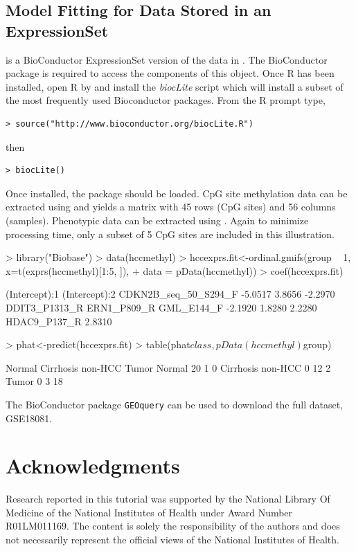 \documentclass[article, shortclass, nojss]{jss}
\begin{document}
\subsection{Model Fitting for Data Stored in an ExpressionSet}
 is a BioConductor ExpressionSet version of the data in . The  BioConductor package is required to access the components of this object. Once R has been installed, open R by and install the \textit{biocLite} script which will install a subset of the most frequently used Bioconductor packages. From the R prompt type,
\begin{verbatim}
> source("http://www.bioconductor.org/biocLite.R")
\end{verbatim}
then
\begin{verbatim}
> biocLite() 
\end{verbatim}
Once installed, the  package should be loaded. CpG site methylation data can be extracted using  and yields a matrix with 45 rows (CpG sites) and  56 columns (samples). Phenotypic data can be extracted using . Again to minimize processing time, only a subset of 5 CpG sites are included in this illustration.
\begin{Schunk}
\begin{Sinput}
> library("Biobase")
> data(hccmethyl)
> hccexprs.fit<-ordinal.gmifs(group ~ 1, x=t(exprs(hccmethyl)[1:5, ]), 
+ 	data = pData(hccmethyl))
> coef(hccexprs.fit)
\end{Sinput}
\begin{Soutput}
       (Intercept):1        (Intercept):2 CDKN2B_seq_50_S294_F 
             -5.0517               3.8656              -2.2970 
       DDIT3_P1313_R          ERN1_P809_R           GML_E144_F 
             -2.1920               1.8280               2.2280 
        HDAC9_P137_R 
              2.8310 
\end{Soutput}
\begin{Sinput}
> phat<-predict(hccexprs.fit)
> table(phat$class, pData(hccmethyl)$group)
\end{Sinput}
\begin{Soutput}
                    Normal Cirrhosis non-HCC Tumor
  Normal                20                 1     0
  Cirrhosis non-HCC      0                12     2
  Tumor                  0                 3    18
\end{Soutput}
\end{Schunk}
The BioConductor package \texttt{GEOquery} can be used to download the full dataset, GSE18081. 

\section*{Acknowledgments}
Research reported in this tutorial was supported by the National Library Of Medicine of the National Institutes of Health under Award Number R01LM011169. The content is solely the responsibility of the authors and does not necessarily represent the official views of the National Institutes of Health.



\end{document}
